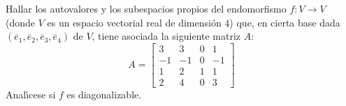 \begin{enunciado}
 Hallar los autovalores y los subespacios propios del endomorfismo $f:V \rightarrow V$ (donde $V$ es un espacio vectorial real de dimensi\'on $4$) que, en cierta base dada $(\overline{e}_1, \overline{e}_2, \overline{e}_3, \overline{e}_4)$ de $V$, tiene asociada la siguiente matriz $A$:
 \begin{equation*}
  A = 
  \begin{bmatrix}
    3 &  3 & 0 &  1 \\
   -1 & -1 & 0 & -1 \\
    1 &  2 & 1 &  1 \\
    2 &  4 & 0 &  3
  \end{bmatrix}
 \end{equation*}
 Anal\'{\i}cese si $f$ es diagonalizable.
\end{enunciado}

